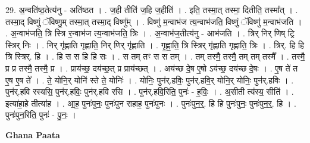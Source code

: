 \documentclass[17pt]{extarticle}
\begin{document}
29. अ॒न्वति॑ष्ठ॒तेत्य॑नु - अति॑ष्ठत । . ज॒ही तीति॑ ज॒हि ज॒हीति॑ । . इति॒ तस्मा॒त् तस्मा॒ दितीति॒ तस्मा᳚त् । . तस्मा॒द् विष्णुं॒ ॅविष्णु॒म् तस्मा॒त् तस्मा॒द् विष्णु᳚म् । . विष्णु॑ म॒न्वाभ॑ज त्य॒न्वाभ॑जति॒ विष्णुं॒ ॅविष्णु॑ म॒न्वाभ॑जति । . अ॒न्वाभ॑जति॒ त्रि स्त्रि र॒न्वाभ॑ज त्य॒न्वाभ॑जति॒ त्रिः । . अ॒न्वाभ॑ज॒तीत्य॑नु - आभ॑जति । . त्रिर् निर् णिष् ट्रि स्त्रिर् निः । . निर् गृ॑ह्णाति गृह्णाति॒ निर् णिर् गृ॑ह्णाति । . गृ॒ह्णा॒ति॒ त्रि स्त्रिर् गृ॑ह्णाति गृह्णाति॒ त्रिः । . त्रिर्. हि हि त्रि स्त्रिर्. हि । . हि स स हि हि सः । . स तम् तꣳ स स तम् । . तम् तस्मै॒ तस्मै॒ तम् तम् तस्मै᳚ । . तस्मै॒ प्र प्र तस्मै॒ तस्मै॒ प्र । . प्राय॑च्छ॒ दय॑च्छ॒त् प्र प्राय॑च्छत् । . अय॑च्छ दे॒ष ए॒षो ऽय॑च्छ॒ दय॑च्छ दे॒षः । . ए॒ष ते॑ त ए॒ष ए॒ष ते᳚ । . ते॒ योनि॒र् योनि॑ स्ते ते॒ योनिः॑ । . योनिः॒ पुन॑र्.हविः॒ पुन॑र्.हवि॒र् योनि॒र् योनिः॒ पुन॑र्.हविः । . पुन॑र्.हवि रस्यसि॒ पुन॑र्.हविः॒ पुन॑र्.हवि रसि । . पुन॑र्.हवि॒रिति॒ पुनः॑ - ह॒विः॒ । . अ॒सीती त्य॑स्य॒ सीति॑ । . इत्या॑हा॒हे तीत्या॑ह । . आ॒ह॒ पुनः॑पुनः॒ पुनः॑पुन राहाह॒ पुनः॑पुनः । . पुनः॑पुन॒र्॒. हि हि पुनः॑पुनः॒ पुनः॑पुन॒र्॒. हि । . पुनः॑पुन॒रिति॒ पुनः॑ - पु॒नः॒ । \newline

\textbf{Ghana Paata } \newline
\end{document}
